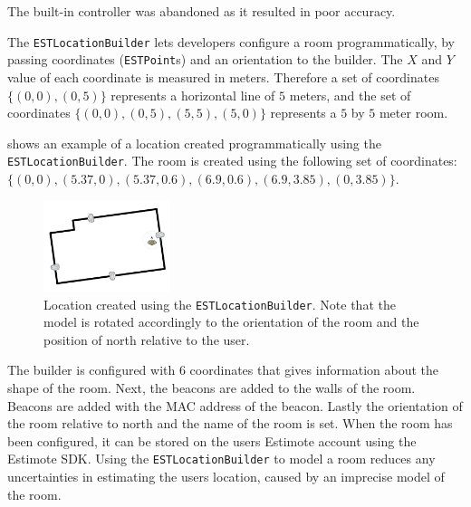 The built-in controller was abandoned as it resulted in poor accuracy.

The \texttt{ESTLocationBuilder} lets developers configure a room programmatically, 
by passing coordinates (\texttt{ESTPoint}s) and an orientation to the builder. 
The $X$ and $Y$ value of each coordinate is measured in meters. 
Therefore a set of coordinates $\{(0, 0), (0, 5)\}$ represents a horizontal line of $5$ meters, 
and the set of coordinates $\{(0,0),(0,5),(5,5),(5,0)\}$ represents a $5$ by $5$ meter room.

 shows an example of a location created programmatically using the \texttt{ESTLocationBuilder}. The room is created using the following set of coordinates: $\{(0, 0), (5.37, 0), (5.37, 0.6), (6.9, 0.6), (6.9, 3.85), (0, 3.85)\}$.

\begin{figure}[!htb]
  \centering
  \includegraphics[width=0.33\textwidth]{images/living-room}
  \caption{Location created using the \texttt{ESTLocationBuilder}. Note that the model is rotated accordingly to the orientation of the room and the position of north relative to the user.}
  \label{fig:estlocationbuilder-livingroom}
\end{figure}

The builder is configured with \num{6} coordinates that gives information about the shape of the room. 
Next, the beacons are added to the walls of the room. 
Beacons are added with the MAC address of the beacon.
Lastly the orientation of the room relative to north and the name of the room is set. 
When the room has been configured, 
it can be stored on the users Estimote account using the Estimote SDK.
Using the \texttt{ESTLocationBuilder} to model a room reduces any uncertainties in estimating the users location, 
caused by an imprecise model of the room.

